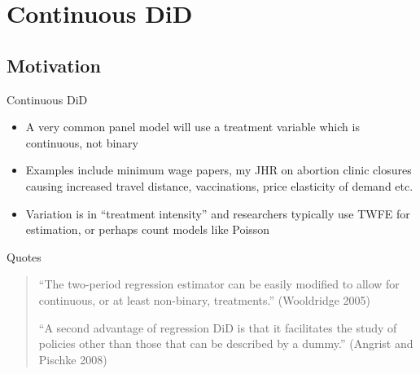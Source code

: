 \documentclass{beamer}
\begin{document}




\section{Continuous DiD}

\subsection{Motivation}

\begin{frame}{Continuous DiD}

\begin{itemize}
\item A very common panel model will use a treatment variable which is continuous, not binary
\item Examples include minimum wage papers, my JHR on abortion clinic closures causing increased travel distance, vaccinations, price elasticity of demand etc.
\item Variation is in ``treatment intensity'' and researchers typically use TWFE for estimation, or perhaps count models like Poisson

\end{itemize}

\end{frame}


\begin{frame}{Quotes}

\begin{quote}
``The two-period regression estimator can be easily modified to allow for continuous, or at least non-binary, treatments.'' (Wooldridge 2005)

\bigskip

``A second advantage of regression DiD is that it facilitates the study of policies other than those that can be described by a dummy.'' (Angrist and Pischke 2008)

\end{quote}

\end{frame}

\clearpage
\end{document}
